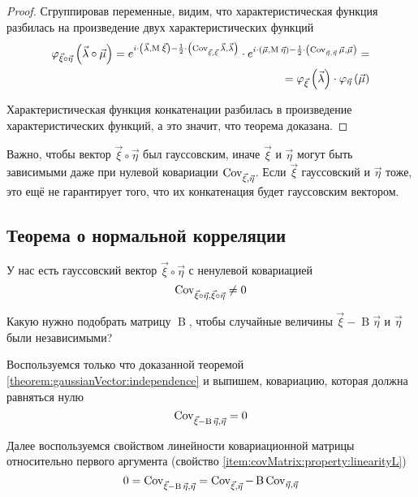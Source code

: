\begin{proof}
  Сгруппировав переменные, видим, что характеристическая функция разбилась
  на произведение двух характеристических функций
  \begin{align*}
      \varphi_{\vec{\xi} \circ \vec{\eta}}\left(
      \vec{\lambda} \circ \vec{\mu} \right)
      = e^{
      i \cdot \left( \vec{\lambda}, \operatorname{M}_{} \vec{\xi} \right)
          - \frac{1}{2} \cdot
        \left( \operatorname{Cov}^{}_{\vec{\xi}, \vec{\xi}} \vec{\lambda}, \vec{\lambda} \right)
          }
      \cdot e^{
          i \cdot \left( \vec{\mu}, \operatorname{M}_{} \vec{\eta} \right)
        - \frac{1}{2} \cdot
            \left( \operatorname{Cov}^{}_{\vec{\eta}, \vec{\eta}} \vec{\mu}, \vec{\mu} \right)
        } = \\
      = \varphi_{\vec{\xi}}\left( \vec{\lambda} \right)
      \cdot \varphi_{\vec{\eta}}\left( \vec{\mu} \right)
  \end{align*}

  Характеристическая функция конкатенации разбилась в произведение
  характеристических функций, а это значит, что теорема доказана.
\end{proof}

\begin{remark}
  Важно, чтобы вектор $\vec{\xi} \circ \vec{\eta}$ был гауссовским, иначе
  $\vec{\xi}$ и $\vec{\eta}$ могут быть зависимыми даже при нулевой ковариации
  $\operatorname{Cov}^{}_{\vec{\xi}, \vec{\eta}}$.
  Если $\vec{\xi}$ гауссовский и $\vec{\eta}$ тоже, это ещё не гарантирует
  того, что их конкатенация будет гауссовским вектором.
\end{remark}

\subsection{Теорема о нормальной корреляции}

У нас есть гауссовский вектор $\vec{\xi} \circ \vec{\eta}$ с ненулевой
ковариацией
$$\operatorname{Cov}^{}_{\vec{\xi} \circ \vec{\eta}, \vec{\xi} \circ \vec{\eta}} \neq 0$$

Какую нужно подобрать матрицу $\operatorname{B}$, чтобы случайные величины
$\vec{\xi} - \operatorname{B} \vec{\eta}$ и $\vec{\eta}$ были независимыми?

Воспользуемся только что доказанной теоремой
\ref{theorem:gaussianVector:independence} и выпишем, ковариацию, которая должна
равняться нулю
$$\operatorname{Cov}^{}_{\vec{\xi} - \operatorname{B} \vec{\eta}, \vec{\eta}} = 0$$

Далее воспользуемся свойством линейности ковариационной матрицы относительно
первого аргумента (свойство \ref{item:covMatrix:property:linearityL})
$$0
  = \operatorname{Cov}^{}_{\vec{\xi} - \operatorname{B} \vec{\eta}, \vec{\eta}}
  = \operatorname{Cov}^{}_{\vec{\xi}, \vec{\eta}}
      - \operatorname{B} \operatorname{Cov}^{}_{\vec{\eta}, \vec{\eta}}$$

